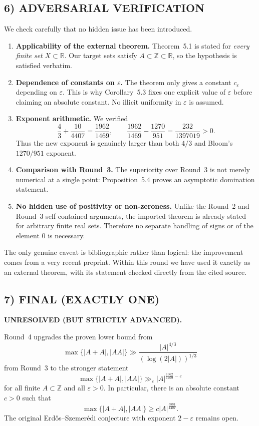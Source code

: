 \subsection{6) ADVERSARIAL VERIFICATION}
We check carefully that no hidden issue has been introduced.
\begin{enumerate}
\item \textbf{Applicability of the external theorem.} Theorem~5.1 is stated for \emph{every finite set} $X\subset\mathbb R$. Our target sets satisfy $A\subset\mathbb Z\subset\mathbb R$, so the hypothesis is satisfied verbatim.

\item \textbf{Dependence of constants on $\varepsilon$.} The theorem only gives a constant $c_{\varepsilon}$ depending on $\varepsilon$. This is why Corollary~5.3 fixes one explicit value of $\varepsilon$ before claiming an absolute constant. No illicit uniformity in $\varepsilon$ is assumed.

\item \textbf{Exponent arithmetic.} We verified
\[
\frac43+\frac{10}{4407}=\frac{1962}{1469},
\qquad
\frac{1962}{1469}-\frac{1270}{951}=\frac{232}{1397019}>0.
\]
Thus the new exponent is genuinely larger than both $4/3$ and Bloom's $1270/951$ exponent.

\item \textbf{Comparison with Round~3.} The superiority over Round~3 is not merely numerical at a single point: Proposition~5.4 proves an asymptotic domination statement.

\item \textbf{No hidden use of positivity or non-zeroness.} Unlike the Round~2 and Round~3 self-contained arguments, the imported theorem is already stated for arbitrary finite real sets. Therefore no separate handling of signs or of the element $0$ is necessary.
\end{enumerate}
The only genuine caveat is bibliographic rather than logical: the improvement comes from a very recent preprint. Within this round we have used it exactly as an external theorem, with its statement checked directly from the cited source.

\subsection{7) FINAL (EXACTLY ONE)}
\textbf{UNRESOLVED (BUT STRICTLY ADVANCED).}

Round~4 upgrades the proven lower bound from
\[
\max\{|A+A|,|AA|\}\gg \frac{|A|^{4/3}}{(\log(2|A|))^{1/3}}
\]
from Round~3 to the stronger statement
\[
\max\{|A+A|,|AA|\}\gg_{\varepsilon}|A|^{\frac{1962}{1469}-\varepsilon}
\]
for all finite $A\subset\mathbb Z$ and all $\varepsilon>0$. In particular, there is an absolute constant $c>0$ such that
\[
\max\{|A+A|,|AA|\}\ge c|A|^{\frac{5881}{4407}}.
\]
The original Erd\H{o}s--Szemer\'edi conjecture with exponent $2-\varepsilon$ remains open.

